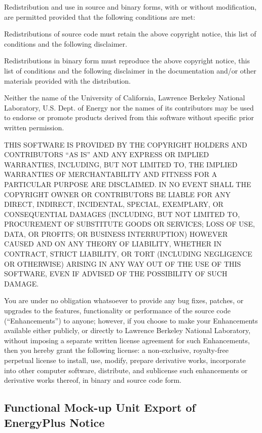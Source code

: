 Redistribution and use in source and binary forms, with or without modification, are permitted provided that the following conditions are met:

Redistributions of source code must retain the above copyright notice, this list of conditions and the following disclaimer.

Redistributions in binary form must reproduce the above copyright notice, this list of conditions and the following disclaimer in the documentation and/or other materials provided with the distribution.

Neither the name of the University of California, Lawrence Berkeley National Laboratory, U.S. Dept. of Energy nor the names of its contributors may be used to endorse or promote products derived from this software without specific prior written permission.

THIS SOFTWARE IS PROVIDED BY THE COPYRIGHT HOLDERS AND CONTRIBUTORS ``AS IS'' AND ANY EXPRESS OR IMPLIED WARRANTIES, INCLUDING, BUT NOT LIMITED TO, THE IMPLIED WARRANTIES OF MERCHANTABILITY AND FITNESS FOR A PARTICULAR PURPOSE ARE DISCLAIMED. IN NO EVENT SHALL THE COPYRIGHT OWNER OR CONTRIBUTORS BE LIABLE FOR ANY DIRECT, INDIRECT, INCIDENTAL, SPECIAL, EXEMPLARY, OR CONSEQUENTIAL DAMAGES (INCLUDING, BUT NOT LIMITED TO, PROCUREMENT OF SUBSTITUTE GOODS OR SERVICES; LOSS OF USE, DATA, OR PROFITS; OR BUSINESS INTERRUPTION) HOWEVER CAUSED AND ON ANY THEORY OF LIABILITY, WHETHER IN CONTRACT, STRICT LIABILITY, OR TORT (INCLUDING NEGLIGENCE OR OTHERWISE) ARISING IN ANY WAY OUT OF THE USE OF THIS SOFTWARE, EVEN IF ADVISED OF THE POSSIBILITY OF SUCH DAMAGE.

You are under no obligation whatsoever to provide any bug fixes, patches, or upgrades to the features, functionality or performance of the source code (``Enhancements'') to anyone; however, if you choose to make your Enhancements available either publicly, or directly to Lawrence Berkeley National Laboratory, without imposing a separate written license agreement for such Enhancements, then you hereby grant the following license: a non-exclusive, royalty-free perpetual license to install, use, modify, prepare derivative works, incorporate into other computer software, distribute, and sublicense such enhancements or derivative works thereof, in binary and source code form.

\subsection{Functional Mock-up Unit Export of EnergyPlus Notice}\label{functional-mock-up-unit-export-of-energyplus-notice}

